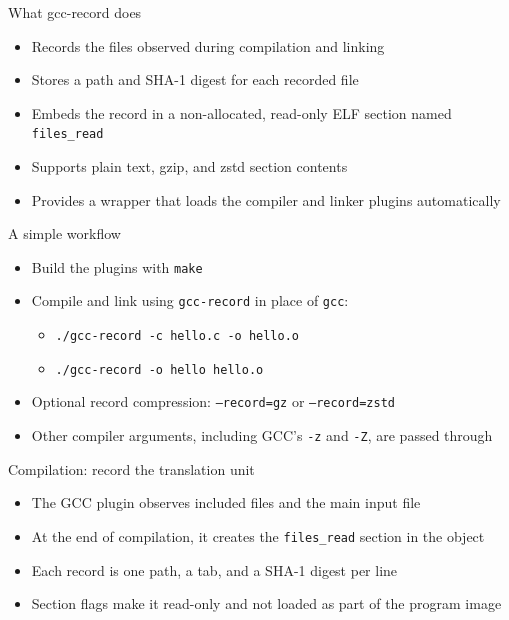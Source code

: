 \documentclass[aspectratio=169]{beamer}
\begin{document}
\begin{frame}{What gcc-record does}
  \begin{itemize}
    \item Records the files observed during compilation and linking
    \item Stores a path and SHA-1 digest for each recorded file
    \item Embeds the record in a non-allocated, read-only ELF section named \texttt{files\_read}
    \item Supports plain text, gzip, and zstd section contents
    \item Provides a wrapper that loads the compiler and linker plugins automatically
  \end{itemize}
\end{frame}

\begin{frame}{A simple workflow}
  \begin{itemize}
    \item Build the plugins with \texttt{make}
    \item Compile and link using \texttt{gcc-record} in place of \texttt{gcc}:
      \begin{itemize}
	\item \texttt{./gcc-record -c hello.c -o hello.o}
	\item \texttt{./gcc-record -o hello hello.o}
      \end{itemize}
    \item Optional record compression: \texttt{--record=gz} or \texttt{--record=zstd}
    \item Other compiler arguments, including GCC's \texttt{-z} and \texttt{-Z}, are passed through
  \end{itemize}
\end{frame}

\begin{frame}{Compilation: record the translation unit}
  \begin{itemize}
    \item The GCC plugin observes included files and the main input file
    \item At the end of compilation, it creates the \texttt{files\_read} section in the object
    \item Each record is one path, a tab, and a SHA-1 digest per line
    \item Section flags make it read-only and not loaded as part of the program image
  \end{itemize}
\end{frame}
\end{document}
